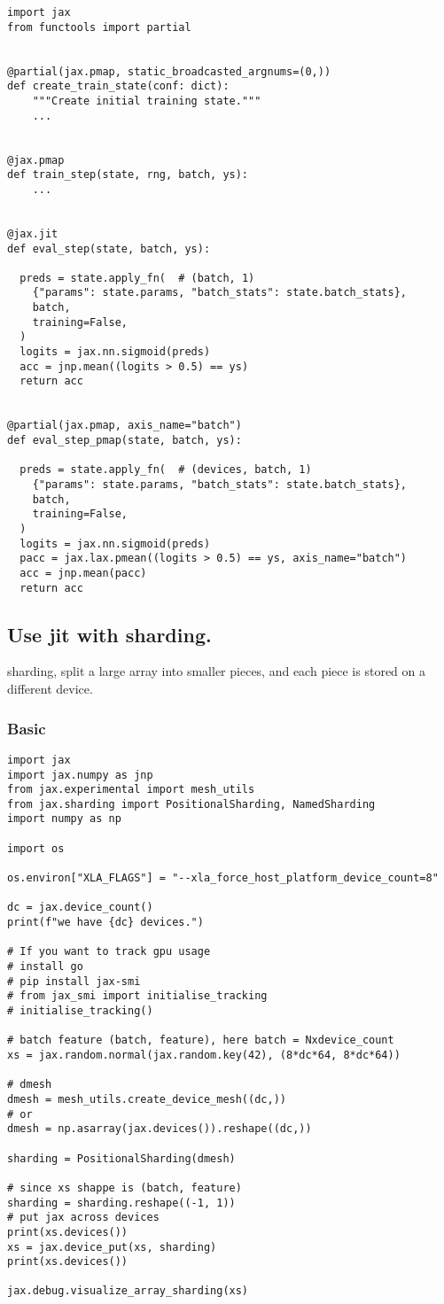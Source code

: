 \documentclass[11pt]{article}
\begin{document}
\begin{verbatim}
import jax
from functools import partial


@partial(jax.pmap, static_broadcasted_argnums=(0,))
def create_train_state(conf: dict):
    """Create initial training state."""
    ...


@jax.pmap
def train_step(state, rng, batch, ys):
    ...


@jax.jit
def eval_step(state, batch, ys):

  preds = state.apply_fn(  # (batch, 1)
    {"params": state.params, "batch_stats": state.batch_stats},
    batch,
    training=False,
  )
  logits = jax.nn.sigmoid(preds)
  acc = jnp.mean((logits > 0.5) == ys)
  return acc


@partial(jax.pmap, axis_name="batch")
def eval_step_pmap(state, batch, ys):

  preds = state.apply_fn(  # (devices, batch, 1)
    {"params": state.params, "batch_stats": state.batch_stats},
    batch,
    training=False,
  )
  logits = jax.nn.sigmoid(preds)
  pacc = jax.lax.pmean((logits > 0.5) == ys, axis_name="batch")
  acc = jnp.mean(pacc)
  return acc
\end{verbatim}
\subsection{Use jit with sharding.}
\label{sec:orgbe40ff0}

sharding, split a large array into smaller pieces, and each piece is stored on a different device.
\subsubsection{Basic}
\label{sec:org05c8698}

\begin{verbatim}
import jax
import jax.numpy as jnp
from jax.experimental import mesh_utils
from jax.sharding import PositionalSharding, NamedSharding
import numpy as np

import os

os.environ["XLA_FLAGS"] = "--xla_force_host_platform_device_count=8"

dc = jax.device_count()
print(f"we have {dc} devices.")

# If you want to track gpu usage
# install go
# pip install jax-smi
# from jax_smi import initialise_tracking
# initialise_tracking()

# batch feature (batch, feature), here batch = Nxdevice_count
xs = jax.random.normal(jax.random.key(42), (8*dc*64, 8*dc*64))

# dmesh
dmesh = mesh_utils.create_device_mesh((dc,))
# or
dmesh = np.asarray(jax.devices()).reshape((dc,))

sharding = PositionalSharding(dmesh)

# since xs shappe is (batch, feature)
sharding = sharding.reshape((-1, 1))
# put jax across devices
print(xs.devices())
xs = jax.device_put(xs, sharding)
print(xs.devices())

jax.debug.visualize_array_sharding(xs)
\end{verbatim}
\end{document}
